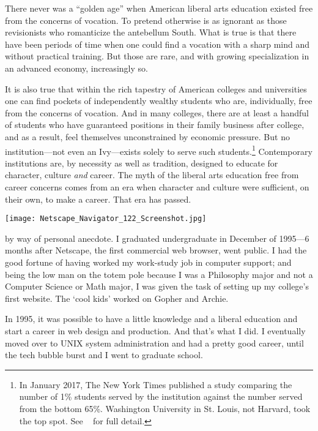 There never was a ``golden age'' when American liberal arts education existed free from the concerns of vocation. To pretend otherwise is as ignorant as those revisionists who romanticize the antebellum South. What is true is that there have been periods of time when one could find a vocation with a sharp mind and without practical training. But those are rare, and with growing specialization in an advanced economy, increasingly so.

It is also true that within the rich tapestry of American colleges and universities one can find pockets of independently wealthy students who are, individually, free from the concerns of vocation. And in many colleges, there are at least a handful of students who have guaranteed positions in their family business after college, and as a result, feel themselves unconstrained by economic pressure. But no institution---not even an Ivy---exists solely to serve such students.\footnote{In January 2017, The New York Times published a study comparing the number of 1\% students served by the institution against the number served from the bottom 65\%. Washington University in St. Louis, not Harvard, took the top spot. See ~\citep{Aisch:2017wg} for full detail.} Contemporary institutions are, by necessity as well as tradition, designed to educate for character, culture \emph{and} career. The myth of the liberal arts education free from career concerns comes from an era when character and culture were sufficient, on their own, to make a career. That era has passed.

\begin{marginfigure}\texttt{[image: Netscape\_Navigator\_122\_Screenshot.jpg]}\caption{Screenshot of Netscape Navigator 1.22, which was the first 'main-stream' web browser.  Screenshot from wikimedia commons By Indolering (Own work) [CC0], via Wikimedia Commons}\label{fig:netscape}\end{marginfigure}  by way of personal anecdote. I graduated undergraduate in December of 1995---6 months after Netscape, the first commercial web browser, went public. I had the good fortune of having worked my work-study job in computer support; and being the low man on the totem pole because I was a Philosophy major and not a Computer Science or Math major, I was given the task of setting up my college's first website. The `cool kids' worked on Gopher and Archie. 

In 1995, it was possible to have a little knowledge and a liberal education and start a career in web design and production. And that's what I did. I eventually moved over to UNIX system administration and had a pretty good career, until the tech bubble burst and I went to graduate school. 

